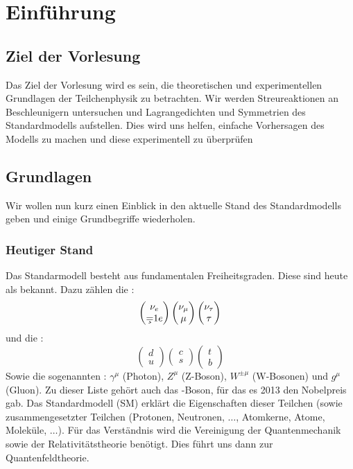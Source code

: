 \chapter{Einführung}
\section{Ziel der Vorlesung}
Das Ziel der Vorlesung wird es sein, die theoretischen und experimentellen
Grundlagen der Teilchenphysik zu betrachten. Wir werden Streureaktionen an 
Beschleunigern untersuchen und Lagrangedichten und Symmetrien des 
Standardmodells aufstellen. Dies wird uns helfen, einfache Vorhersagen des 
Modells zu machen und diese experimentell zu überprüfen

\section{Grundlagen}
Wir wollen nun kurz einen Einblick in den aktuelle Stand des Standardmodells
geben und einige Grundbegriffe wiederholen.

\subsection{Heutiger Stand}
Das Standarmodell besteht aus fundamentalen Freiheitsgraden. Diese sind heute
als  bekannt. Dazu zählen die
:
%
\begin{equation*}
	\begin{pmatrix}
		\nu_e \\\c = 1
		e
	\end{pmatrix}
	\begin{pmatrix}
		\nu_{\mu} \\
		\mu
	\end{pmatrix}
	\begin{pmatrix}
		\nu_{\tau} \\
		\tau
	\end{pmatrix}
\end{equation*}
%
und die : 
\begin{equation*}
	\begin{pmatrix}
		d \\
		u
	\end{pmatrix}
	\begin{pmatrix}
		c \\
		s
	\end{pmatrix}
	\begin{pmatrix}
		t \\
		b
	\end{pmatrix}
\end{equation*}
%
Sowie die sogenannten : $ \gamma^{\mu}$ (Photon),
$Z^{\mu}$ (Z-Boson), $W^{\pm \mu}$ (W-Bosonen) und $g^{\mu}$ (Gluon).
Zu dieser Liste gehört auch das -Boson, für das es 2013 den
Nobelpreis gab.
Das Standardmodell (SM) erklärt die Eigenschaften dieser Teilchen (sowie 
zusammengesetzter Teilchen (Protonen, Neutronen, $ \dots $, Atomkerne, Atome, 
Moleküle, $ \dots $).
Für das Verständnis wird die Vereinigung der Quantenmechanik sowie der 
Relativitätstheorie benötigt. 
Dies führt uns dann zur Quantenfeldtheorie.

